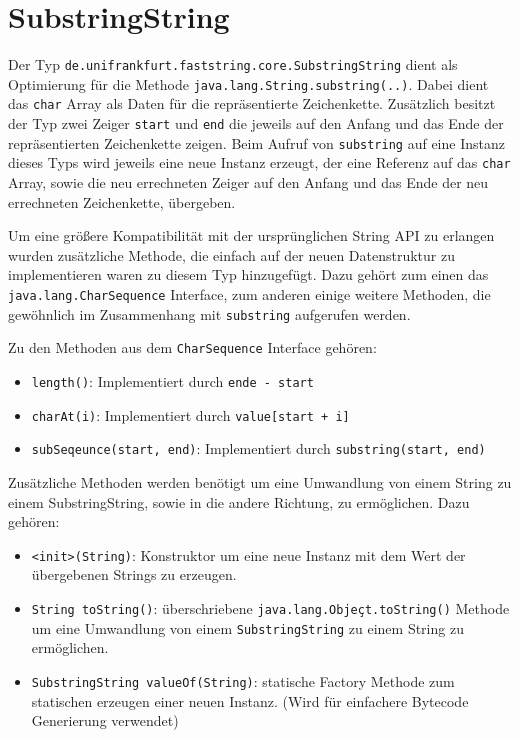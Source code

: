 \section{SubstringString} 

Der Typ \texttt{de.unifrankfurt.faststring.core.SubstringString} dient als Optimierung für
die Methode \texttt{java.lang.String.substring(..)}. Dabei dient das \texttt{char} Array als
Daten für die repräsentierte Zeichenkette. Zusätzlich besitzt der Typ zwei Zeiger \texttt{start}
und \texttt{end} die jeweils auf den Anfang und das Ende der repräsentierten Zeichenkette zeigen.
Beim Aufruf von \texttt{substring} auf eine Instanz dieses Typs wird jeweils eine neue Instanz
erzeugt, der eine Referenz auf das \texttt{char} Array, sowie die neu errechneten Zeiger auf
den Anfang und das Ende der neu errechneten Zeichenkette, übergeben. 

Um eine größere Kompatibilität mit der ursprünglichen String API zu erlangen wurden zusätzliche
Methode, die einfach auf der neuen Datenstruktur zu implementieren waren zu diesem Typ hinzugefügt.
Dazu gehört zum einen das \texttt{java.lang.CharSequence} Interface, zum anderen einige 
weitere Methoden, die gewöhnlich im Zusammenhang mit \texttt{substring} aufgerufen werden.

Zu den Methoden aus dem \texttt{CharSequence} Interface gehören:

\begin{itemize}
	\item \texttt{length()}: Implementiert durch \texttt{ende - start}
	\item \texttt{charAt(i)}: Implementiert durch \texttt{value[start + i]}
	\item \texttt{subSeqeunce(start, end)}: Implementiert durch \texttt{substring(start, end)}
\end{itemize}

Zusätzliche Methoden werden benötigt um eine Umwandlung von einem String zu einem SubstringString, sowie 
in die andere Richtung, zu ermöglichen. Dazu gehören:

\begin{itemize}
	\item \texttt{<init>(String)}: Konstruktor um eine neue Instanz mit dem Wert der übergebenen
	Strings zu erzeugen.
	\item \texttt{String toString()}: überschriebene \texttt{java.lang.Objeçt.toString()} Methode
	um eine Umwandlung von einem \texttt{SubstringString} zu einem String zu ermöglichen.
	\item \texttt{SubstringString valueOf(String)}: statische Factory Methode zum statischen 
	erzeugen einer neuen Instanz. (Wird für einfachere Bytecode Generierung verwendet) 
\end{itemize}

